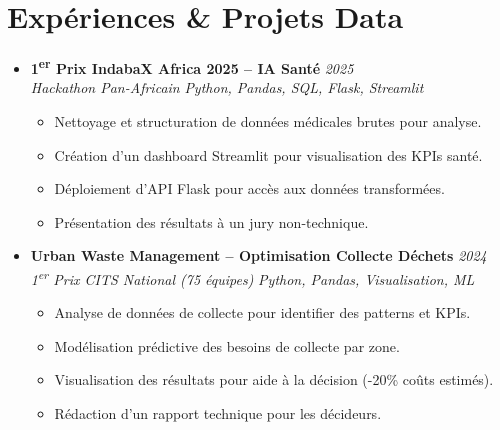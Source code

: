 \documentclass[a4paper,11pt]{article}
\begin{document}
\section{Expériences \& Projets Data}
\begin{itemize}[leftmargin=*, label={-}]

\item \textbf{1\textsuperscript{er} Prix IndabaX Africa 2025 -- IA Santé} \hfill \textit{2025} \\
\textit{Hackathon Pan-Africain} \hfill \textit{Python, Pandas, SQL, Flask, Streamlit}
\vspace{-2pt}
    \begin{itemize}[leftmargin=0.4cm, nosep, label=\tiny$\bullet$]
        \item \small{Nettoyage et structuration de données médicales brutes pour analyse.}
        \item \small{Création d'un dashboard Streamlit pour visualisation des KPIs santé.}
        \item \small{Déploiement d'API Flask pour accès aux données transformées.}
        \item \small{Présentation des résultats à un jury non-technique.}
    \end{itemize}
\vspace{3pt}

\item \textbf{Urban Waste Management -- Optimisation Collecte Déchets} \hfill \textit{2024} \\
\textit{1\textsuperscript{er} Prix CITS National (75 équipes)} \hfill \textit{Python, Pandas, Visualisation, ML}
\vspace{-2pt}
    \begin{itemize}[leftmargin=0.4cm, nosep, label=\tiny$\bullet$]
        \item \small{Analyse de données de collecte pour identifier des patterns et KPIs.}
        \item \small{Modélisation prédictive des besoins de collecte par zone.}
        \item \small{Visualisation des résultats pour aide à la décision (-20\% coûts estimés).}
        \item \small{Rédaction d'un rapport technique pour les décideurs.}
    \end{itemize}
\vspace{3pt}


\end{itemize}
\end{document}
